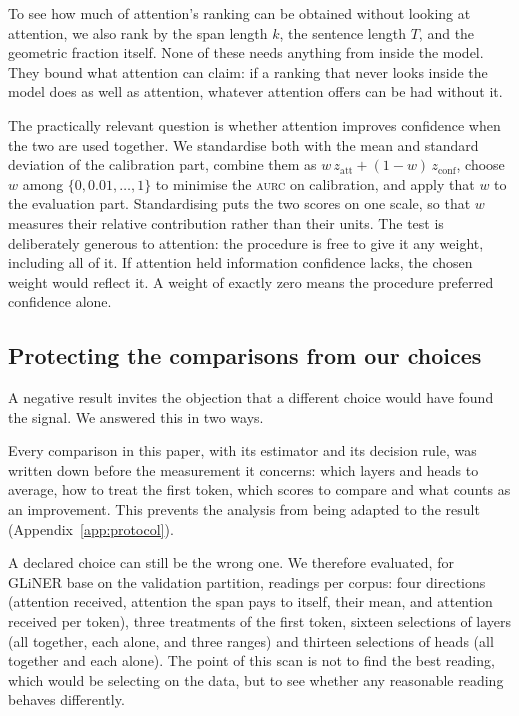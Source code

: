 \documentclass[11pt,a4paper]{article}
\newcommand{\gliner}{GLiNER}
\newcommand{\aurc}{\textsc{aurc}}
\begin{document}
To see how much of attention's ranking can be obtained without looking at attention, we
also rank by the span length $k$, the sentence length $T$, and the geometric fraction itself. None of these needs anything from
inside the model. They bound what attention can claim: if a ranking that never looks inside the
model does as well as attention, whatever attention offers can be had without it.

The practically relevant question is whether attention improves confidence when the two are used together. We standardise both with the mean and standard deviation of the calibration part, combine them as
$w\,z_{\text{att}}+(1-w)\,z_{\text{conf}}$, choose $w$ among $\{0,0.01,\dots,1\}$ to minimise the \aurc{} on calibration, and
apply that $w$ to the evaluation part. Standardising puts the two scores on one scale, so that $w$ measures their relative contribution rather
than their units. The test is deliberately generous to attention: the procedure is free to give it any weight,
including all of it. If attention held information confidence lacks, the chosen weight would reflect it. A weight of exactly zero
means the procedure preferred confidence alone.

\subsection{Protecting the comparisons from our choices}
\label{sec:guard}

A negative result invites the objection that a different choice would have found the signal. We answered this in two ways.

Every comparison in this paper, with its estimator and its decision rule, was written down
before the measurement it concerns: which layers and heads to average, how to treat the first token, which scores to compare and
what counts as an improvement. This prevents the analysis from being adapted to the result (Appendix~\ref{app:protocol}).

A declared choice can still be the wrong one. We therefore evaluated, for \gliner{}
base on the validation partition, \periReadings{} readings per corpus: four directions (attention received, attention the span pays
to itself, their mean, and attention received per token), three treatments of the first token, sixteen selections of layers (all
together, each alone, and three ranges) and thirteen selections of heads (all together and each alone). The point of this scan is
not to find the best reading, which would be selecting on the data, but to see whether any reasonable reading behaves differently.
\end{document}
